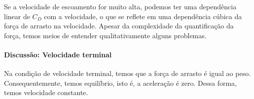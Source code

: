 Se a velocidade de escoamento for muito alta, podemos ter uma dependência linear de $C_D$ com a velocidade, o que se reflete em uma dependência cúbica da força de arrasto na velocidade. Apesar da complexidade da quantificação da força, temos meios de entender qualitativamente alguns problemas.

\paragraph{Discussão: Velocidade terminal}
\begin{marginfigure}[-3cm]
\centering
{}
\caption{Na condição de velocidade terminal, temos que a força de arrasto é igual ao peso. Consequentemente, temos equilíbrio, isto é, a aceleração é zero. Dessa forma, temos velocidade constante.}
\end{marginfigure}

